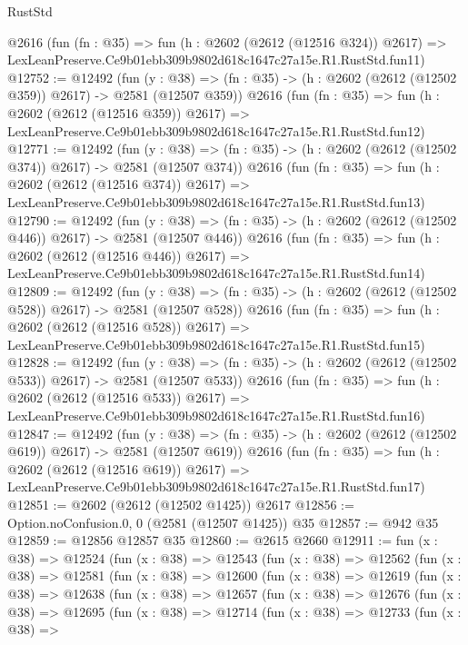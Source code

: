 \begin{lexlean}{RustStd}
\begin{coremodule}
    @2616
    (fun (fn : @35) =>
    fun (h : @2602 (@2612 (@12516 @324)) @2617) =>
    LexLeanPreserve.Ce9b01ebb309b9802d618c1647c27a15e.R1.RustStd.fun11)
@12752 := @12492
    (fun (y : @38) => (fn : @35) -> (h : @2602 (@2612 (@12502 @359)) @2617) -> @2581 (@12507 @359))
    @2616
    (fun (fn : @35) =>
    fun (h : @2602 (@2612 (@12516 @359)) @2617) =>
    LexLeanPreserve.Ce9b01ebb309b9802d618c1647c27a15e.R1.RustStd.fun12)
@12771 := @12492
    (fun (y : @38) => (fn : @35) -> (h : @2602 (@2612 (@12502 @374)) @2617) -> @2581 (@12507 @374))
    @2616
    (fun (fn : @35) =>
    fun (h : @2602 (@2612 (@12516 @374)) @2617) =>
    LexLeanPreserve.Ce9b01ebb309b9802d618c1647c27a15e.R1.RustStd.fun13)
@12790 := @12492
    (fun (y : @38) => (fn : @35) -> (h : @2602 (@2612 (@12502 @446)) @2617) -> @2581 (@12507 @446))
    @2616
    (fun (fn : @35) =>
    fun (h : @2602 (@2612 (@12516 @446)) @2617) =>
    LexLeanPreserve.Ce9b01ebb309b9802d618c1647c27a15e.R1.RustStd.fun14)
@12809 := @12492
    (fun (y : @38) => (fn : @35) -> (h : @2602 (@2612 (@12502 @528)) @2617) -> @2581 (@12507 @528))
    @2616
    (fun (fn : @35) =>
    fun (h : @2602 (@2612 (@12516 @528)) @2617) =>
    LexLeanPreserve.Ce9b01ebb309b9802d618c1647c27a15e.R1.RustStd.fun15)
@12828 := @12492
    (fun (y : @38) => (fn : @35) -> (h : @2602 (@2612 (@12502 @533)) @2617) -> @2581 (@12507 @533))
    @2616
    (fun (fn : @35) =>
    fun (h : @2602 (@2612 (@12516 @533)) @2617) =>
    LexLeanPreserve.Ce9b01ebb309b9802d618c1647c27a15e.R1.RustStd.fun16)
@12847 := @12492
    (fun (y : @38) => (fn : @35) -> (h : @2602 (@2612 (@12502 @619)) @2617) -> @2581 (@12507 @619))
    @2616
    (fun (fn : @35) =>
    fun (h : @2602 (@2612 (@12516 @619)) @2617) =>
    LexLeanPreserve.Ce9b01ebb309b9802d618c1647c27a15e.R1.RustStd.fun17)
@12851 := @2602 (@2612 (@12502 @1425)) @2617
@12856 := Option.noConfusion.{0, 0} (@2581 (@12507 @1425)) @35
@12857 := @942 @35
@12859 := @12856 @12857 @35
@12860 := @2615 @2660
@12911 := fun (x : @38) =>
  @12524
    (fun (x : @38) =>
    @12543
      (fun (x : @38) =>
      @12562
        (fun (x : @38) =>
        @12581
          (fun (x : @38) =>
          @12600
            (fun (x : @38) =>
            @12619
              (fun (x : @38) =>
              @12638
                (fun (x : @38) =>
                @12657
                  (fun (x : @38) =>
                  @12676
                    (fun (x : @38) =>
                    @12695
                      (fun (x : @38) =>
                      @12714
                        (fun (x : @38) =>
                        @12733
                          (fun (x : @38) =>

\end{coremodule}
\end{lexlean}
